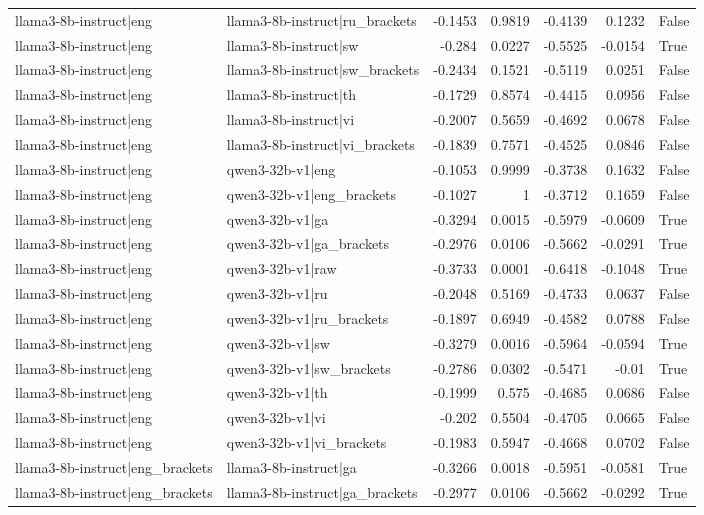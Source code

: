 \begin{table}
\begin{tabular}{l l r r r r l}
llama3-8b-instruct|eng & llama3-8b-instruct|ru_brackets & -0.1453 & 0.9819 & -0.4139 & 0.1232 & False \\
llama3-8b-instruct|eng & llama3-8b-instruct|sw & -0.284 & 0.0227 & -0.5525 & -0.0154 & True \\
llama3-8b-instruct|eng & llama3-8b-instruct|sw_brackets & -0.2434 & 0.1521 & -0.5119 & 0.0251 & False \\
llama3-8b-instruct|eng & llama3-8b-instruct|th & -0.1729 & 0.8574 & -0.4415 & 0.0956 & False \\
llama3-8b-instruct|eng & llama3-8b-instruct|vi & -0.2007 & 0.5659 & -0.4692 & 0.0678 & False \\
llama3-8b-instruct|eng & llama3-8b-instruct|vi_brackets & -0.1839 & 0.7571 & -0.4525 & 0.0846 & False \\
llama3-8b-instruct|eng & qwen3-32b-v1|eng & -0.1053 & 0.9999 & -0.3738 & 0.1632 & False \\
llama3-8b-instruct|eng & qwen3-32b-v1|eng_brackets & -0.1027 & 1 & -0.3712 & 0.1659 & False \\
llama3-8b-instruct|eng & qwen3-32b-v1|ga & -0.3294 & 0.0015 & -0.5979 & -0.0609 & True \\
llama3-8b-instruct|eng & qwen3-32b-v1|ga_brackets & -0.2976 & 0.0106 & -0.5662 & -0.0291 & True \\
llama3-8b-instruct|eng & qwen3-32b-v1|raw & -0.3733 & 0.0001 & -0.6418 & -0.1048 & True \\
llama3-8b-instruct|eng & qwen3-32b-v1|ru & -0.2048 & 0.5169 & -0.4733 & 0.0637 & False \\
llama3-8b-instruct|eng & qwen3-32b-v1|ru_brackets & -0.1897 & 0.6949 & -0.4582 & 0.0788 & False \\
llama3-8b-instruct|eng & qwen3-32b-v1|sw & -0.3279 & 0.0016 & -0.5964 & -0.0594 & True \\
llama3-8b-instruct|eng & qwen3-32b-v1|sw_brackets & -0.2786 & 0.0302 & -0.5471 & -0.01 & True \\
llama3-8b-instruct|eng & qwen3-32b-v1|th & -0.1999 & 0.575 & -0.4685 & 0.0686 & False \\
llama3-8b-instruct|eng & qwen3-32b-v1|vi & -0.202 & 0.5504 & -0.4705 & 0.0665 & False \\
llama3-8b-instruct|eng & qwen3-32b-v1|vi_brackets & -0.1983 & 0.5947 & -0.4668 & 0.0702 & False \\
llama3-8b-instruct|eng_brackets & llama3-8b-instruct|ga & -0.3266 & 0.0018 & -0.5951 & -0.0581 & True \\
llama3-8b-instruct|eng_brackets & llama3-8b-instruct|ga_brackets & -0.2977 & 0.0106 & -0.5662 & -0.0292 & True \\

\end{tabular}
\end{table}
